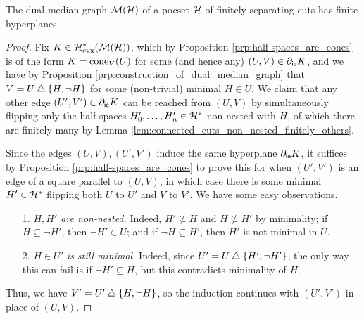 \documentclass[reqno]{amsart}
\begin{document}
    \begin{lemma}
        The dual median graph $\mathcal{M}(\mathcal{H})$ of a pocset $\mathcal{H}$ of finitely-separating cuts has finite hyperplanes.
    \end{lemma}
    \begin{proof}
        Fix $K\in\mathcal{H}^\ast_\mathrm{cvx}(\mathcal{M}(\mathcal{H}))$, which by Proposition \ref{prp:half-spaces_are_cones} is of the form $K=\operatorname{cone}_V(U)$ for some (and hence any) $(U,V)\in\partial_\mathsf{ie}K$, and we have by Proposition \ref{prp:construction_of_dual_median_graph} that $V=U\bigtriangleup\left\{H,\lnot H\right\}$ for some (non-trivial) minimal $H\in U$. We claim that any other edge $(U',V')\in\partial_\mathsf{ie}K$ can be reached from $(U,V)$ by simultaneously flipping only the half-spaces $H'_0,\dots,H'_n\in\mathcal{H}^\ast$ non-nested with $H$, of which there are finitely-many by Lemma \ref{lem:connected_cuts_non_nested_finitely_others}.

        Since the edges $(U,V),(U',V')$ induce the same hyperplane $\partial_\mathsf{ie}K$, it suffices by Proposition \ref{prp:half-spaces_are_cones} to prove this for when $(U',V')$ is an edge of a square parallel to $(U,V)$, in which case there is some minimal $H'\in\mathcal{H}^\ast$ flipping both  $U$ to $U'$ and $V$ to $V'$. We have some easy observations.
        \begin{enumerate}
            \item[1.] \textit{$H,H'$ are non-nested.} Indeed, $H'\not\subseteq H$ and $H\not\subseteq H'$ by minimality; if $H\subseteq\lnot H'$, then $\lnot H'\in U$; and if $\lnot H\subseteq H'$, then $H'$ is not minimal in $U$.
            \item[2.] \textit{$H\in U'$ is still minimal.} Indeed, since $U'=U\bigtriangleup\left\{H',\lnot H'\right\}$, the only way this can fail is if $\lnot H'\subseteq H$, but this contradicts minimality of $H$.
        \end{enumerate}
        Thus, we have $V'=U'\bigtriangleup\left\{H,\lnot H\right\}$, so the induction continues with $(U',V')$ in place of $(U,V)$.
    \end{proof}
\end{document}
